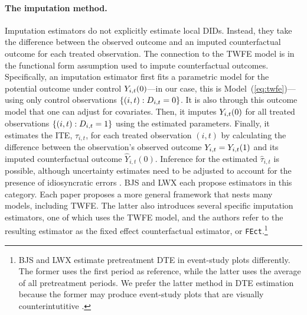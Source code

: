 \documentclass[12pt]{article}
\begin{document}
\paragraph*{The imputation method.} Imputation estimators do not explicitly estimate local DIDs. Instead, they take the difference between the observed outcome and an imputed counterfactual outcome for each treated observation. The connection to the TWFE model is in the functional form assumption used to impute counterfactual outcomes. Specifically, an imputation estimator first fits a parametric model for the potential outcome under control $Y_{i,t}(0)$---in our case, this is Model~(\ref{eq:twfe})---using only control observations $\{(i,t):D_{i,t}=0\}$. It is also through this outcome model that one can adjust for covariates. Then, it imputes $Y_{i,t}(0)$ for all treated observations $\{(i,t):D_{i,t}=1\}$ using the estimated parameters. Finally, it estimates the ITE, $\tau_{i,t}$, for each treated observation $(i,t)$ by calculating the difference between the observation's observed outcome $Y_{i,t}=Y_{i,t}(1)$ and its imputed counterfactual outcome $\hat{Y}_{i,t}(0)$. Inference for the estimated $\hat\tau_{i,t}$ is possible, although uncertainty estimates need to be adjusted to account for the presence of idiosyncratic errors \citep[e.g.,][]{bai2021matrix}.
BJS \citeyearpar{BJS2021} and LWX \citeyearpar{LWX2022} each propose estimators in this category. Each paper proposes a more general framework that nests many models, including TWFE. The latter also introduces several specific imputation estimators, one of which uses the TWFE model, and the authors refer to the resulting estimator as the fixed effect counterfactual estimator, or \texttt{FEct}.\footnote{BJS \citeyearpar{BJS2021} and LWX \citeyearpar{LWX2022} estimate pretreatment DTE in event-study plots differently. The former uses the first period as reference, while the latter uses the average of all pretreatment periods. We prefer the latter method in DTE estimation because the former may produce event-study plots that are visually counterintutitive \citep{Roth2024interpret}.} 
\end{document}

